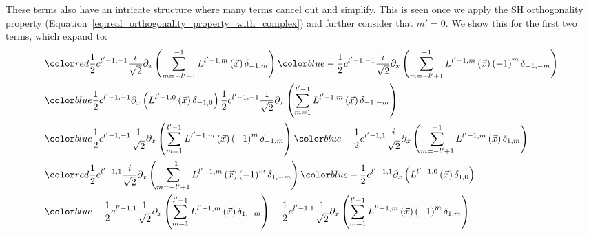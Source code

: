 \documentclass{egpubl}
\makeatletter
\def\mathcolor#1#{\@mathcolor{#1}}
\def\@mathcolor#1#2#3{%
  \protect\leavevmode
  \begingroup\color#1{#2}#3\endgroup
}
\makeatother
\begin{document}
These terms also have an intricate structure where many terms cancel out and simplify. This is seen once we apply the SH orthogonality property (Equation~\ref{eq:real_orthogonality_property_with_complex}) and further consider that $m'=0$. We show this for the first two terms, which expand to:
\begin{align*}
&
\mathcolor{red}
{
\frac{1}{2}c^{{l'-1,-1}}\frac{i}{\sqrt{2}}\partial_x\left(\sum_{m=-l'+1}^{-1}{L^{{l'-1,m}}\left (\vec{x} \right )\delta_{-1,m}}\right)
}
\mathcolor{blue}
{
-\frac{1}{2}c^{{l'-1,-1}}\frac{i}{\sqrt{2}}\partial_x\left(\sum_{m=-l'+1}^{-1}{L^{{l'-1,m}}\left (\vec{x} \right )\left({-1}\right)^{m}\delta_{-1,-m}}\right)
}
\\&
\mathcolor{blue}
{
\frac{1}{2}c^{{l'-1,-1}}\partial_x\left(L^{{l'-1,0}}\left (\vec{x} \right )\delta_{-1,0}\right)
}
\frac{1}{2}c^{{l'-1,-1}}\frac{1}{\sqrt{2}}\partial_x\left(\sum_{m=1}^{l'-1}{L^{{l'-1,m}}\left (\vec{x} \right )\delta_{-1,-m}}\right)
\\&
\mathcolor{blue}
{
\frac{1}{2}c^{{l'-1,-1}}\frac{1}{\sqrt{2}}\partial_x\left(\sum_{m=1}^{l'-1}{L^{{l'-1,m}}\left (\vec{x} \right )\left({-1}\right)^{m}\delta_{-1,m}}\right)
}
\mathcolor{blue}
{
-\frac{1}{2}e^{{l'-1,1}}\frac{i}{\sqrt{2}}\partial_x\left(\sum_{m=-l'+1}^{-1}{L^{{l'-1,m}}\left (\vec{x} \right )\delta_{1,m}}\right)
}
\\&
\mathcolor{red}
{
\frac{1}{2}e^{{l'-1,1}}\frac{i}{\sqrt{2}}\partial_x\left(\sum_{m=-l'+1}^{-1}{L^{{l'-1,m}}\left (\vec{x} \right )\left({-1}\right)^{m}\delta_{1,-m}}\right)
}
\mathcolor{blue}
{
-\frac{1}{2}e^{{l'-1,1}}\partial_x\left(L^{{l'-1,0}}\left (\vec{x} \right )\delta_{1,0}\right)
}
\\&
\mathcolor{blue}
{
-\frac{1}{2}e^{{l'-1,1}}\frac{1}{\sqrt{2}}\partial_x\left(\sum_{m=1}^{l'-1}{L^{{l'-1,m}}\left (\vec{x} \right )\delta_{1,-m}}\right)
}
-\frac{1}{2}e^{{l'-1,1}}\frac{1}{\sqrt{2}}\partial_x\left(\sum_{m=1}^{l'-1}{L^{{l'-1,m}}\left (\vec{x} \right )\left({-1}\right)^{m}\delta_{1,m}}\right)
\end{align*}
\end{document}
